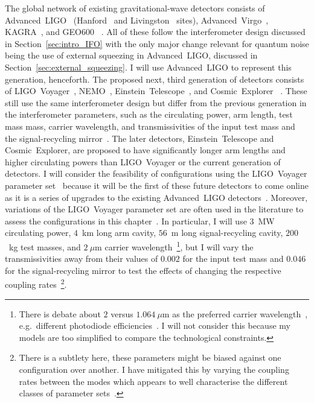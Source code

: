 The global network of existing gravitational-wave detectors consists of Advanced~LIGO~\cite{} (Hanford~\cite{} and Livingston~\cite{} sites), Advanced~Virgo~\cite{}, KAGRA~\cite{}, and GEO600~\cite{} . All of these follow the interferometer design discussed in Section~\ref{sec:intro_IFO} with the only major change relevant for quantum noise  being the use of external squeezing in Advanced~LIGO, discussed in Section~\ref{sec:external_squeezing}. I will use Advanced~LIGO to represent this generation, henceforth. 
The proposed next, third generation of  detectors consists of LIGO~Voyager~\cite{}, NEMO~\cite{}, Einstein~Telescope~\cite{}, and Cosmic~Explorer~\cite{} . These still use the same interferometer design   but differ from the previous generation in the interferometer parameters, such as the circulating power, arm length, test mass mass, carrier wavelength, and transmissivities of the input test mass and the signal-recycling mirror~\cite{}. 
The later detectors, Einstein~Telescope and Cosmic~Explorer, are proposed to have significantly longer arm lengths and higher circulating powers than LIGO~Voyager or the current generation of detectors. 
I will consider the feasibility of configurations using the LIGO~Voyager parameter set~\cite{} because it will be the first of these future detectors to come online as it is a series of upgrades to the existing Advanced~LIGO detectors~\cite{}. Moreover, variations of the LIGO~Voyager parameter set are often used in the literature to assess the configurations in this chapter~\cite{Li2020,Miao2018,Korobko,}. In particular, I will use  $3$~MW circulating power, $4$~km long arm cavity, $56$~m long signal-recycling cavity, $200$~kg test masses, and $2~\mu\text{m}$ carrier wavelength~\footnote{There is debate about $2$ versus $1.064~\mu\text{m}$ as the preferred carrier wavelength~\cite{}, e.g.\ different photodiode efficiencies~\cite{}. I will not consider this because my models are too simplified to compare the technological constraints.}, but I will vary the transmissivities away from their values of $0.002$ for the input test mass and $0.046$ for the signal-recycling mirror to test the effects of changing the respective coupling rates~\footnote{There is a subtlety here, these parameters might be biased against one configuration over another. I have mitigated this by varying the coupling rates between the modes which appears to well characterise the different classes of parameter sets~\cite{}.}. 

